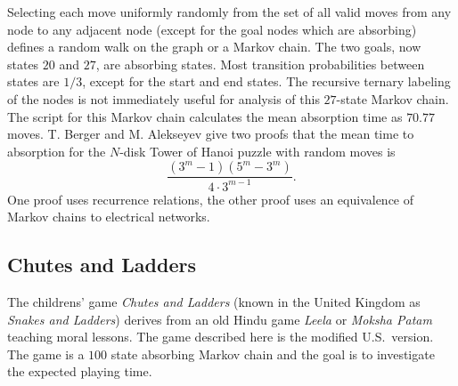 \documentclass[12pt]{article}
\begin{document}
Selecting each move uniformly randomly from the set of all valid moves
from any node to any adjacent node (except for the goal nodes which are
absorbing) defines a random walk on the graph or a Markov chain.  The
two goals, now states \( 20 \) and \( 27 \), are absorbing states.  Most
transition probabilities between states are \( 1/3 \), except for the
start and end states.  The recursive ternary labeling of the nodes is
not immediately useful for analysis of this \( 27 \)-state Markov chain.
The script for this Markov chain calculates the mean absorption time as \(
70.77 \) moves.  T. Berger and M. Alekseyev
\cite{Alekseyev2015} give two proofs that the mean time to absorption
for the \( N \)-disk Tower of Hanoi puzzle with random moves is
\[
    \frac{(3^m-1)(5^m- 3^m)}{4 \cdot 3^{m-1}}.
\] One proof uses recurrence relations, the other proof uses an
equivalence of Markov chains to electrical networks.

\subsection*{Chutes and Ladders}

The childrens' game \emph{Chutes and Ladders} (known in the United
Kingdom as \emph{Snakes and Ladders}) derives from an old Hindu game
\emph{Leela} or \emph{Moksha Patam} teaching moral lessons.  The game
described here is the modified U.S.\ version.  The game is a \( 100 \)
state absorbing Markov chain and the goal is to investigate the expected
playing time.~%
\end{document}
